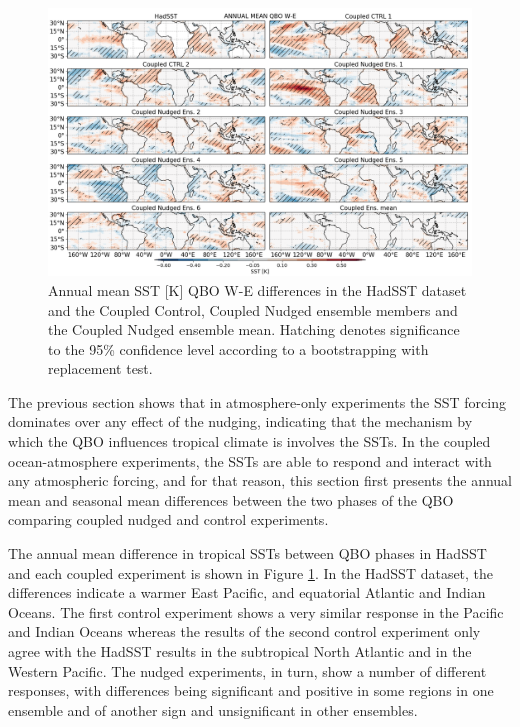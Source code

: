 \begin{figure}[t!]
\centering
 \includegraphics[width=\linewidth]{figures/sst_check_climqbowqboe.png}
\caption[Annual mean SST response to the QBO in coupled nudged experiments]{ Annual mean SST [K] QBO W-E differences in the HadSST dataset and the Coupled Control, Coupled Nudged ensemble members and the Coupled Nudged ensemble mean. Hatching denotes significance to the 95\% confidence level according to a bootstrapping with replacement test.}
\label{fig:sst_clim_coupled}
\end{figure}


The previous section shows that in atmosphere-only experiments the SST forcing dominates over any effect of the nudging, indicating that the mechanism by which the QBO influences tropical climate is involves the SSTs. In the coupled ocean-atmosphere experiments, the SSTs are able to respond and interact with any atmospheric forcing, and for that reason, this section first presents the annual mean and seasonal mean differences between the two phases of the QBO comparing coupled nudged and control experiments. 

The annual mean difference in tropical SSTs between QBO phases in HadSST and each coupled experiment is shown in Figure \ref{fig:sst_clim_coupled}. In the HadSST dataset, the differences indicate a warmer East Pacific, and equatorial Atlantic and Indian Oceans. The first control experiment shows a very similar response in the Pacific and Indian Oceans whereas the results of the second control experiment only agree with the HadSST results in the subtropical North Atlantic and in the Western Pacific. 
The nudged experiments, in turn, show a number of different responses, with differences being significant and positive in some regions in one ensemble and of another sign and unsignificant in other ensembles. 

